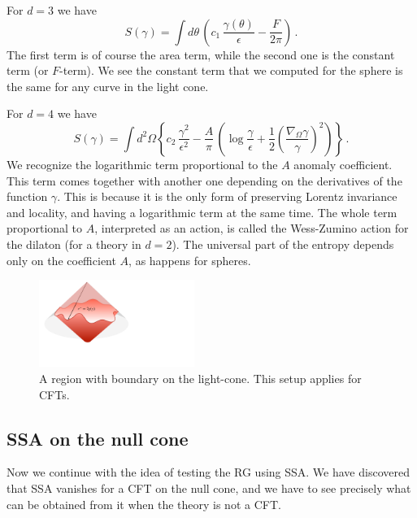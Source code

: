 \documentclass[11pt]{article}
\numberwithin{equation}{section}
\newcommand{\be}{\begin{equation}}
\newcommand{\ee}{\end{equation}}
\begin{document}
For $d=3$ we have 
\be
S(\gamma)=\int d\theta\,\left (c_1\, \frac{\gamma(\theta)}{\epsilon} -\frac{F}{2\pi} \right)\,.\label{tresd}
\ee
The first term is of course the area term, while the second one is the constant term (or $F$-term). We see the constant term that we computed for the sphere is the same for any curve in the light cone. 

For $d=4$ we have
\be
S(\gamma) = \int d^2 \Omega \left \lbrace  c_2\, \frac{\gamma^2}{\epsilon^2}- \frac{A}{\pi} \,  \left(\log \frac{\gamma}{\epsilon} + \frac{1}{2}\left(\frac{\nabla_\Omega \gamma}{\gamma} \right)^2 \right) \right \rbrace\,.\label{cuatrod}
\ee
We recognize the logarithmic term proportional to the $A$ anomaly coefficient. This term comes together with another one depending on the derivatives of the function $\gamma$. This is because it is the only form of preserving Lorentz invariance and locality, and having a logarithmic term at the same time. The whole term proportional to $A$, interpreted as an action, is called the Wess-Zumino action for the dilaton (for a theory in $d=2$). The universal part of the entropy depends only on the coefficient $A$, as happens for spheres.   

\begin{figure}[t]
\begin{center}
\includegraphics[width=0.45\textwidth]{nullcone.pdf} 
\caption{A region with boundary on the light-cone. This setup applies for CFTs.}
\label{rmenos}
\end{center}
\end{figure}

\subsection{SSA on the null cone}
Now we continue with the idea of testing the RG using SSA. We have discovered that SSA vanishes for a CFT on the null cone, and we have to see precisely what can be obtained from it when the theory is not a CFT. 
\end{document}
